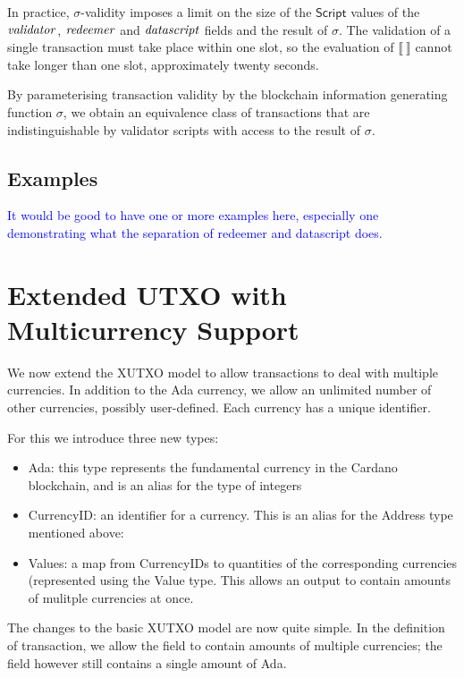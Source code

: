 \documentclass[a4paper]{article}
\newcommand{\blue}[1]{\textcolor{blue}{#1}}
\newcommand{\s}{\textsf}  %
\theoremstyle{definition}  %
\begin{document}
In practice, $\sigma$-validity imposes a limit on the size of the
$\mathsf{Script}$ values of the $\mathit{validator}$, $\mathit{redeemer}$ and
$\mathit{datascript}$ fields and the result of $\sigma$. The validation of a
single transaction must take place within one slot, so the evaluation
of $\llbracket ~ \rrbracket$ cannot take longer than one slot,
approximately twenty seconds.

By parameterising transaction validity by the blockchain information
generating function $\sigma$, we obtain an equivalence class of
transactions that are indistinguishable by validator scripts with
access to the result of $\sigma$.

\subsection{Examples}
\blue{It would be good to have one or more examples here, especially one
  demonstrating what the separation of redeemer and datascript does.}

\section{Extended UTXO with Multicurrency Support}
\label{sec:multicurrency}
We now extend the XUTXO model to allow transactions to deal with
multiple currencies.  In addition to the Ada currency, we allow an
unlimited number of other currencies, possibly user-defined.  Each currency
has a unique identifier.

For this we introduce three new types:
\begin{itemize}
\item \s{Ada}: this type represents the fundamental currency in the Cardano
  blockchain, and is an alias for the type of integers
\item \s{CurrencyID}: an identifier for a currency. This is an alias
  for the \s{Address} type mentioned above:
\item \s{Values}: a map from \s{CurrencyID}s to quantities of the
  corresponding currencies (represented using the \s{Value} type.
  This allows an output to contain amounts of mulitple currencies at once.
\end{itemize}

The changes to the basic XUTXO model are now quite simple.  In the
definition of transaction, we allow the \forge{} field to contain
amounts of multiple currencies; the \fee{} field however still
contains a single amount of \s{Ada}.  
\end{document}
